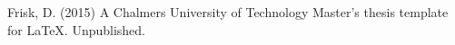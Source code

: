 \begin{thebibliography}{69}

 Frisk, D. (2015) A Chalmers University of Technology Master's thesis template for \LaTeX . Unpublished.

\end{thebibliography}

